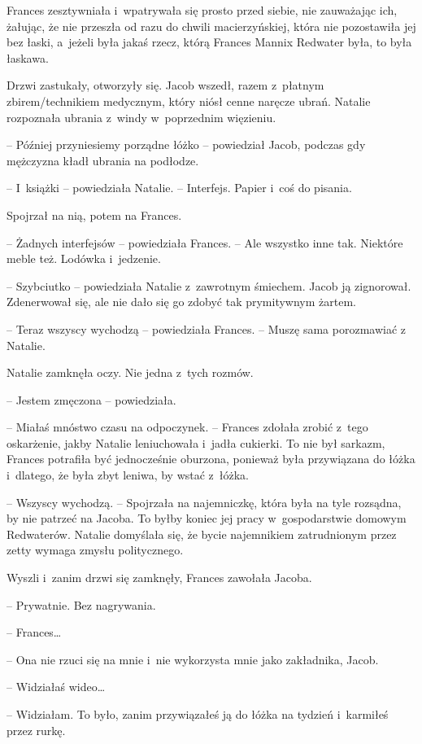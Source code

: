 \documentclass[oneside,polish,11pt,sfheadings]{mwbk}
\begin{document}
Frances zesztywniała i~wpatrywała się prosto przed siebie, nie
zauważając ich, żałując, że nie przeszła od razu do chwili
macierzyńskiej, która nie pozostawiła jej bez łaski, a~jeżeli była jakaś
rzecz, którą Frances Mannix Redwater była, to była łaskawa.

Drzwi zastukały, otworzyły się. Jacob wszedł, razem z~płatnym
zbirem/technikiem medycznym, który niósł cenne naręcze ubrań. Natalie
rozpoznała ubrania z~windy w~poprzednim więzieniu.

-- Później przyniesiemy porządne łóżko -- powiedział Jacob, podczas gdy
mężczyzna kładł ubrania na podłodze.

-- I~książki -- powiedziała Natalie. -- Interfejs. Papier i~coś do pisania.

Spojrzał na nią, potem na Frances.

-- Żadnych interfejsów -- powiedziała Frances. -- Ale wszystko inne tak.
Niektóre meble też. Lodówka i~jedzenie.

-- Szybciutko -- powiedziała Natalie z~zawrotnym śmiechem. Jacob ją
zignorował. Zdenerwował się, ale nie dało się go zdobyć tak prymitywnym
żartem.

-- Teraz wszyscy wychodzą -- powiedziała Frances. -- Muszę sama porozmawiać
z Natalie.

Natalie zamknęła oczy. Nie jedna z~tych rozmów.

-- Jestem zmęczona -- powiedziała.

-- Miałaś mnóstwo czasu na odpoczynek. -- Frances zdołała zrobić z~tego
oskarżenie, jakby Natalie leniuchowała i~jadła cukierki. To nie był
sarkazm, Frances potrafiła być jednocześnie oburzona, ponieważ była
przywiązana do łóżka i~dlatego, że była zbyt leniwa, by wstać z~łóżka.

-- Wszyscy wychodzą. -- Spojrzała na najemniczkę, która była na tyle
rozsądna, by nie patrzeć na Jacoba. To byłby koniec jej pracy w~gospodarstwie domowym Redwaterów. Natalie domyślała się, że bycie
najemnikiem zatrudnionym przez zetty wymaga zmysłu politycznego.

Wyszli i~zanim drzwi się zamknęły, Frances zawołała Jacoba. 

-- Prywatnie.
Bez nagrywania.

-- Frances\ldots 

-- Ona nie rzuci się na mnie i~nie wykorzysta mnie jako zakładnika,
Jacob.

-- Widziałaś wideo\ldots 

-- Widziałam. To było, zanim przywiązałeś ją do łóżka na tydzień i~karmiłeś przez rurkę.
\end{document}
